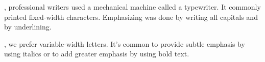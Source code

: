 \documentclass{book}
\begin{document}
, professional
writers used a mechanical machine called a typewriter.
It commonly printed fixed-width characters. 
Emphasizing was done by writing all capitals
and by underlining.

, we prefer variable-width
letters. It’s common to provide subtle emphasis by using
italics or to add greater emphasis by using bold text.
\end{document}
